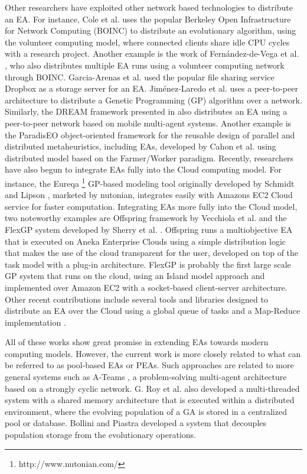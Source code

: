 Other researchers have exploited other network based technologies to distribute an EA.
For instance, Cole et al. \cite{MilkyWay} uses the popular Berkeley Open Infrastructure for Network Computing (BOINC) to distribute an evolutionary algorithm,
using the volunteer computing model, where connected clients share idle CPU cycles with a research project.
Another example is the work of Fern\'andez-de-Vega et al. \cite{nc}, who also distributes multiple EA runs using a volunteer computing network through BOINC.
Garcia-Arenas et al. \cite{garcia2011} used the popular file sharing service Dropbox as a storage server for an EA.
Jim\'enez-Laredo et al. \cite{garcia2011} uses a peer-to-peer architecture to distribute a Genetic Programming (GP) algorithm over a network.
Similarly, the DREAM framework presented in \cite{DREAM} also distributes an EA using a peer-to-peer network based on mobile multi-agent systems.
Another example is the ParadisEO object-oriented framework for the reusable design of parallel and distributed metaheuristics, including EAs, developed
by Cahon et al. \cite{ParadisEO} using distributed model based on the Farmer/Worker paradigm.
Recently, researchers have also begun to integrate EAs fully into the Cloud computing model.
For instance, the Eureqa \footnote{http://www.nutonian.com/} GP-based modeling tool originally developed by Schmidt and Lipson \cite{free-form}, marketed by nutonian,
integrates easily with Amazons EC2 Cloud service for faster computation.
Integrating EAs more fully into the Cloud model, two noteworthy examples are Offspring framework by Vecchiola et al. \cite{VecchiolaCORR}
and the FlexGP system developed by Sherry et al. \cite{FlexGP}.
Offspring runs a multiobjective EA that is executed on Aneka Enterprise Clouds using a simple distribution logic that makes the use of the cloud
transparent for the user, developed on top of the task model with a plug-in architecture.
FlexGP is probably the first large scale GP system that runs on the cloud, using an Island model approach and implemented over
Amazon EC2 with a socket-based client-server architecture.
Other recent contributions include several tools and libraries designed to distribute an EA over the Cloud using a global queue of tasks and a Map-Reduce
implementation \cite{FlexGP}.


All of these works show great promise in extending EAs towards modern computing models.
However, the current work is more closely related to what can be referred to as pool-based EAs or PEAs.
Such approaches are related to more general systems such as A-Teams \cite{ateam}, a problem-solving multi-agent architecture based on a strongly cyclic network.
G. Roy et al. \cite{roy:2009} also developed a multi-threaded system with a shared memory architecture that is executed within a distributed environment,
where the evolving population of a GA is stored in a centralized pool or database. Bollini and Piastra \cite{bollini:1999} developed a system that decouples population storage from the evolutionary operations.

